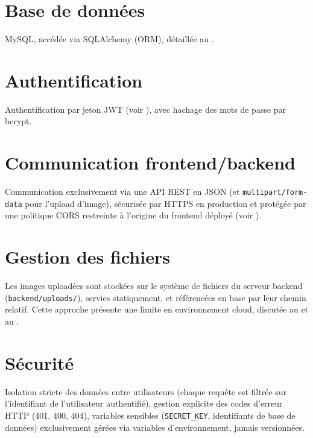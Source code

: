 \section{Base de donn\'ees}

MySQL, acc\'ed\'ee via SQLAlchemy (ORM), d\'etaill\'ee au .

\section{Authentification}

Authentification par jeton JWT (voir ), avec hachage des mots de passe par bcrypt.

\section{Communication frontend/backend}

Communication exclusivement via une API REST en JSON (et \texttt{multipart/form-data} pour l'upload d'image), s\'ecuris\'ee par HTTPS en production et prot\'eg\'ee par une politique CORS restreinte \`a l'origine du frontend d\'eploy\'e (voir ).

\section{Gestion des fichiers}

Les images upload\'ees sont stock\'ees sur le syst\`eme de fichiers du serveur backend (\texttt{backend/uploads/}), servies statiquement, et r\'ef\'erenc\'ees en base par leur chemin relatif. Cette approche pr\'esente une limite en environnement cloud, discut\'ee au  et au .

\section{S\'ecurit\'e}

Isolation stricte des donn\'ees entre utilisateurs (chaque requ\^ete est filtr\'ee sur l'identifiant de l'utilisateur authentifi\'e), gestion explicite des codes d'erreur HTTP (401, 400, 404), variables sensibles (\texttt{SECRET\_KEY}, identifiants de base de donn\'ees) exclusivement g\'er\'ees via variables d'environnement, jamais versionn\'ees.

